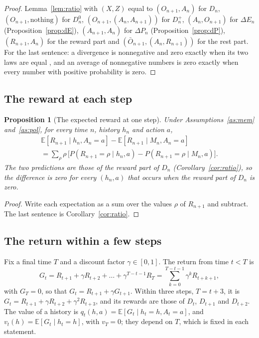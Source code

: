 \documentclass{article}
\newtheorem{proposition}{Proposition}[section]
\theoremstyle{definition}
\theoremstyle{remark}
\newcommand{\E}{\mathbb{E}}
\newcommand{\dE}{\Delta E}
\newcommand{\dP}{\Delta P}
\newcommand{\Ob}{\bar O}
\begin{document}
\begin{proof}
Lemma~\ref{lem:ratio} with $(X,Z)$ equal to $(O_{n+1},A_n)$ for $D_n$, $(O_{n+1},\text{nothing})$ for $D^0_n$, $(O_{n+1},(A_n,A_{n+1}))$ for $D^+_n$, $(A_n,O_{n+1})$ for $\dE_n$ (Proposition~\ref{prop:dE}), $(A_{n+1},A_n)$ for $\dP_n$ (Proposition~\ref{prop:dP}), $(R_{n+1},A_n)$ for the reward part and $(\Ob_{n+1},(A_n,R_{n+1}))$ for the rest part. For the last sentence: a divergence is nonnegative and zero exactly when its two laws are equal \citep[Theorem~2.6.3]{cover2006elements}, and an average of nonnegative numbers is zero exactly when every number with positive probability is zero.
\end{proof}

\subsection{The reward at each step}

\begin{proposition}[The expected reward at one step]\label{prop:reward-step}
Under Assumptions~\ref{as:mem} and~\ref{as:pol}, for every time $n$, history $h_n$ and action $a$,
\begin{multline*}
\E[R_{n+1}\mid h_n,A_n=a]-\E[R_{n+1}\mid M_n,A_n=a]\\=\sum_\rho\rho\,\big[P(R_{n+1}=\rho\mid h_n,a)-P(R_{n+1}=\rho\mid M_n,a)\big].
\end{multline*}
The two predictions are those of the reward part of $D_n$ (Corollary~\ref{cor:ratio}), so the difference is zero for every $(h_n,a)$ that occurs when the reward part of $D_n$ is zero.
\end{proposition}

\begin{proof}
Write each expectation as a sum over the values $\rho$ of $R_{n+1}$ and subtract. The last sentence is Corollary~\ref{cor:ratio}.
\end{proof}

\subsection{The return within a few steps}

Fix a final time $T$ and a discount factor $\gamma\in[0,1]$. The return from time $t<T$ is
\[
G_t=R_{t+1}+\gamma R_{t+2}+\dots+\gamma^{T-t-1}R_T=\sum_{k=0}^{T-t-1}\gamma^kR_{t+k+1},
\]
with $G_T=0$, so that $G_t=R_{t+1}+\gamma G_{t+1}$. Within three steps, $T=t+3$, it is $G_t=R_{t+1}+\gamma R_{t+2}+\gamma^2R_{t+3}$, and its rewards are those of $D_t$, $D_{t+1}$ and $D_{t+2}$. The value of a history is $q_t(h,a)=\E[G_t\mid h_t=h,A_t=a]$, and $v_t(h)=\E[G_t\mid h_t=h]$, with $v_T=0$; they depend on $T$, which is fixed in each statement.
\end{document}
